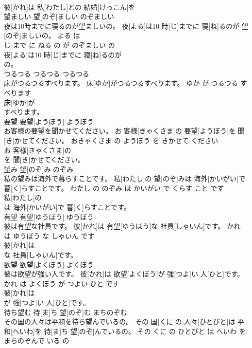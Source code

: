 \documentclass[8pt]{extreport}
\begin{document}
\begin{CJK}{UTF8}{min}
\\	彼[かれ]は 私[わたし]との 結婚[けっこん]を
\\	望ましい	望[のぞ]ましい	のぞましい	
\\	夜は10時までに寝るのが望ましいの。	夜[よる]は10 時[じ]までに 寝[ね]るのが 望[のぞ]ましいの。	よる は 
\\	じ まで に ねる の が のぞましい の	
\\	夜[よる]は10 時[じ]までに 寝[ね]るのが
\\	の。			
\\	つるつる	つるつる	つるつる	
\\	床がつるつるすべります。	床[ゆか]がつるつるすべります。	ゆか が つるつる すべります	
\\	床[ゆか]が
\\	すべります。			
\\	要望	要望[ようぼう]	ようぼう	
\\	お客様の要望を聞かせてください。	お 客様[きゃくさま]の 要望[ようぼう]を 聞[き]かせてください。	おきゃくさま の ようぼう を きかせて ください	
\\	お 客様[きゃくさま]の
\\	を 聞[き]かせてください。			
\\	望み	望[のぞ]み	のぞみ	
\\	私の望みは海外で暮らすことです。	私[わたし]の 望[のぞ]みは 海外[かいがい]で 暮[く]らすことです。	わたし の のぞみ は かいがい で くらす こと です	
\\	私[わたし]の
\\	は 海外[かいがい]で 暮[く]らすことです。			
\\	有望	有望[ゆうぼう]	ゆうぼう	
\\	彼は有望な社員です。	彼[かれ]は 有望[ゆうぼう]な 社員[しゃいん]です。	かれ は ゆうぼう な しゃいん です	
\\	彼[かれ]は
\\	な 社員[しゃいん]です。			
\\	欲望	欲望[よくぼう]	よくぼう	
\\	彼は欲望が強い人です。	彼[かれ]は 欲望[よくぼう]が 強[つよ]い 人[ひと]です。	かれ は よくぼう が つよい ひと です	
\\	彼[かれ]は
\\	が 強[つよ]い 人[ひと]です。			
\\	待ち望む	待[ま]ち 望[のぞ]む	まちのぞむ	
\\	その国の人々は平和を待ち望んでいるの。	その 国[くに]の 人々[ひとびと]は 平和[へいわ]を 待[ま]ち 望[のぞ]んでいるの。	その くに の ひとびと は へいわ を まちのぞんで いる の	

\end{CJK}
\end{document}

